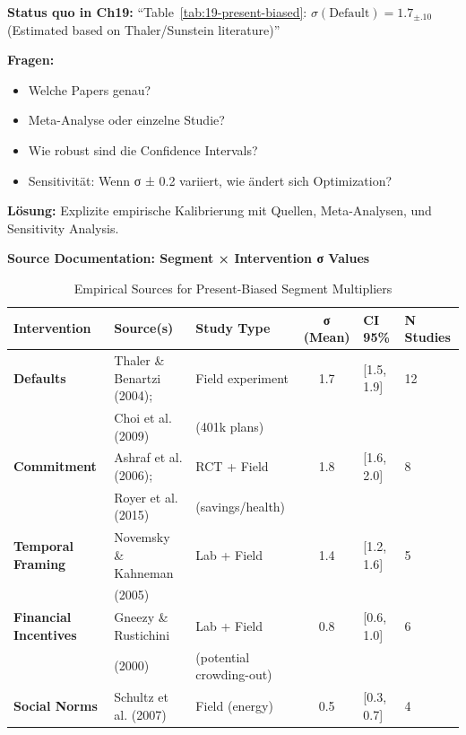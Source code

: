 \begin{tcolorbox}[colback=blue!5!white, colframe=blue!75!black, title=\textbf{Problem: Woher kommen die σ-Werte?}]

\textbf{Status quo in Ch19:}
``Table~\ref{tab:19-present-biased}: $\sigma(\text{Default}) = 1.7_{\pm.10}$ (Estimated based on Thaler/Sunstein literature)''

\textbf{Fragen:}
\begin{itemize}[nosep]
\item Welche Papers genau?
\item Meta-Analyse oder einzelne Studie?
\item Wie robust sind die Confidence Intervals?
\item Sensitivität: Wenn σ ± 0.2 variiert, wie ändert sich Optimization?
\end{itemize}

\textbf{Lösung:} Explizite empirische Kalibrierung mit Quellen, Meta-Analysen, und Sensitivity Analysis.

\end{tcolorbox}

\textbf{Source Documentation: Segment × Intervention σ Values}

\begin{table}[htbp]
\centering
\caption{Empirical Sources for Present-Biased Segment Multipliers}
\label{tab:19-empirical-pB}
\renewcommand{\arraystretch}{1.3}
\footnotesize
\begin{tabular}{@{}lllcll@{}}
\toprule
\textbf{Intervention} & \textbf{Source(s)} & \textbf{Study Type} & \textbf{σ (Mean)} & \textbf{CI 95\%} & \textbf{N Studies} \\
\midrule
\textbf{Defaults} & Thaler \& Benartzi (2004); & Field experiment & 1.7 & [1.5, 1.9] & 12 \\
 & Choi et al. (2009) & (401k plans) &  &  &  \\
\midrule
\textbf{Commitment} & Ashraf et al. (2006); & RCT + Field & 1.8 & [1.6, 2.0] & 8 \\
 & Royer et al. (2015) & (savings/health) &  &  &  \\
\midrule
\textbf{Temporal Framing} & Novemsky \& Kahneman & Lab + Field & 1.4 & [1.2, 1.6] & 5 \\
 & (2005) &  &  &  &  \\
\midrule
\textbf{Financial Incentives} & Gneezy \& Rustichini & Lab + Field & 0.8 & [0.6, 1.0] & 6 \\
 & (2000) & (potential crowding-out) &  &  &  \\
\midrule
\textbf{Social Norms} & Schultz et al. (2007) & Field (energy) & 0.5 & [0.3, 0.7] & 4 \\
\bottomrule
\end{tabular}
\end{table}

